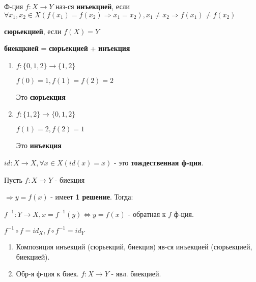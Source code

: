 \begin{definition}
Ф-ция $f: X \rightarrow Y$ наз-ся  \textbf{инъекцией}, если $\forall x_1, x_2 \in X (f(x_1) = f(x_2) \Rightarrow x_1 = x_2), x_1 \neq x_2 \Rightarrow f(x_1) \neq f(x_2)$ 

\textbf{сюрьекцией}, если $f(X) = Y$

\textbf{биекцкией} = \textbf{сюрьекцией} + \textbf{инъекция}
\end{definition}
\begin{example}
\begin{enumerate}
    \item 
        
$f: \{0, 1, 2\} \rightarrow \{1, 2\}$ 

$f(0) = 1, f(1) = f(2) = 2$

Это \textbf{сюрьекция}
    \item
$f: \{1, 2\} \rightarrow \{0, 1, 2\}$ 

$f(1) = 2, f(2) = 1$ 

Это \textbf{инъекция}
\end{enumerate}

\end{example}

\begin{example}
$id: X \rightarrow X, \forall x \in X (id(x) = x)$ - это \textbf{тождественная ф-ция}.
\end{example}

\begin{example}
Пусть $f: X \rightarrow Y$ - биекция

$\Rightarrow y = f(x)$ - имеет \textbf{1 решение}. Тогда:

$f^{-1}: Y \rightarrow X, x = f^{-1}(y) \iff y = f(x)$ - обратная к $f$ ф-ция.

$f^{-1} \circ f = id_X, f \circ f^{-1} = id_Y$
\end{example}

\begin{task}
\begin{enumerate}
    \item Композиция инъекций (сюрьекций, биекция) яв-ся инъекцией (сюрьекцией, биекцией).
    \item Обр-я ф-ция к биек. $f: X \rightarrow Y$ - явл. биекцией.
\end{enumerate}
\end{task}

